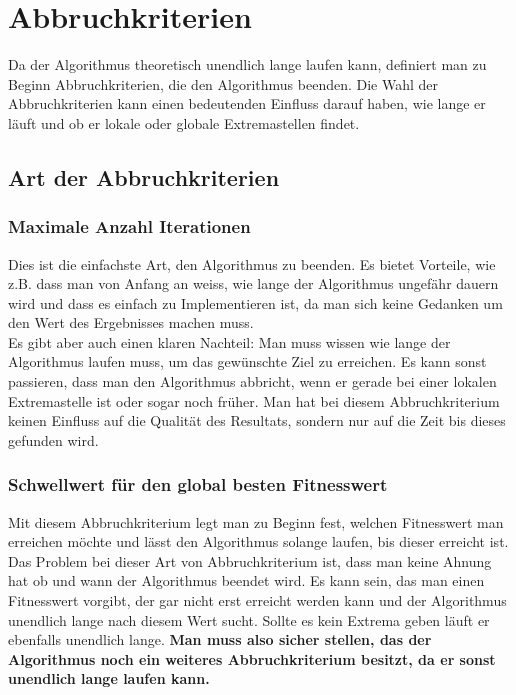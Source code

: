 \section{Abbruchkriterien}

Da der Algorithmus theoretisch unendlich lange laufen kann, definiert man zu Beginn Abbruchkriterien, die den Algorithmus beenden.
Die Wahl der Abbruchkriterien kann einen bedeutenden Einfluss darauf haben, wie lange er läuft und ob er lokale oder globale Extremastellen findet.

\subsection{Art der Abbruchkriterien}

\subsubsection{Maximale Anzahl Iterationen}
Dies ist die einfachste Art, den Algorithmus zu beenden. Es bietet Vorteile, wie z.B. dass man von Anfang an weiss, wie lange der Algorithmus ungefähr dauern wird und dass es einfach zu Implementieren ist, da man sich keine Gedanken um den Wert des Ergebnisses machen muss. \\
Es gibt aber auch einen klaren Nachteil: Man muss wissen wie lange der Algorithmus laufen muss, um das gewünschte Ziel zu erreichen. Es kann sonst passieren, dass man den Algorithmus abbricht, wenn er gerade bei einer lokalen Extremastelle ist oder sogar noch früher. Man hat bei diesem Abbruchkriterium keinen Einfluss auf die Qualität des Resultats, sondern nur auf die Zeit bis dieses gefunden wird.

\subsubsection{Schwellwert für den global besten Fitnesswert}
Mit diesem Abbruchkriterium legt man zu Beginn fest, welchen Fitnesswert man erreichen möchte und lässt den Algorithmus solange laufen, bis dieser erreicht ist.\\
Das Problem bei dieser Art von Abbruchkriterium ist, dass man keine Ahnung hat ob und wann der Algorithmus beendet wird. Es kann sein, das man einen Fitnesswert vorgibt, der gar nicht erst erreicht werden kann und der Algorithmus unendlich lange nach diesem Wert sucht. Sollte es kein Extrema geben läuft er ebenfalls unendlich lange. \textbf{Man muss also sicher stellen, das der Algorithmus noch ein weiteres Abbruchkriterium besitzt, da er sonst unendlich lange laufen kann.}

